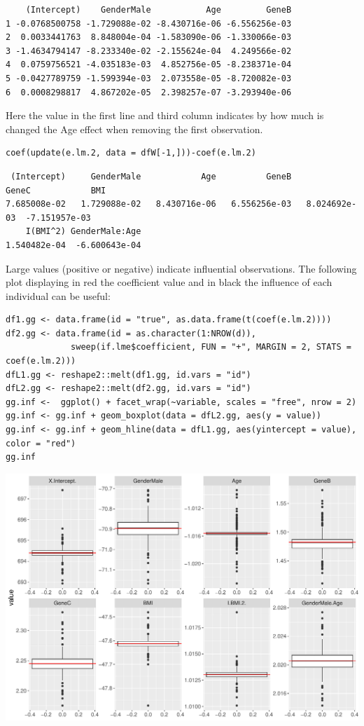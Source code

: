 \documentclass[12pt]{article}
\begin{document}
\begin{verbatim}
    (Intercept)    GenderMale           Age         GeneB
1 -0.0768500758 -1.729088e-02 -8.430716e-06 -6.556256e-03
2  0.0033441763  8.848004e-04 -1.583090e-06 -1.330066e-03
3 -1.4634794147 -8.233340e-02 -2.155624e-04  4.249566e-02
4  0.0759756521 -4.035183e-03  4.852756e-05 -8.238371e-04
5 -0.0427789759 -1.599394e-03  2.073558e-05 -8.720082e-03
6  0.0008298817  4.867202e-05  2.398257e-07 -3.293940e-06
\end{verbatim}

Here the value in the first line and third column indicates by how
much is changed the Age effect when removing the first observation.
\lstset{language=r,label= ,caption= ,captionpos=b,numbers=none}
\begin{lstlisting}
coef(update(e.lm.2, data = dfW[-1,]))-coef(e.lm.2)
\end{lstlisting}

\begin{verbatim}
 (Intercept)     GenderMale            Age          GeneB          GeneC            BMI 
7.685008e-02   1.729088e-02   8.430716e-06   6.556256e-03   8.024692e-03  -7.151957e-03 
    I(BMI^2) GenderMale:Age 
1.540482e-04  -6.600643e-04
\end{verbatim}

Large values (positive or negative) indicate influential
observations. The following plot displaying in red the coefficient
value and in black the influence of each individual can be useful:
\lstset{language=r,label= ,caption= ,captionpos=b,numbers=none}
\begin{lstlisting}
df1.gg <- data.frame(id = "true", as.data.frame(t(coef(e.lm.2))))
df2.gg <- data.frame(id = as.character(1:NROW(d)), 
		     sweep(if.lme$coefficient, FUN = "+", MARGIN = 2, STATS = coef(e.lm.2)))
dfL1.gg <- reshape2::melt(df1.gg, id.vars = "id")
dfL2.gg <- reshape2::melt(df2.gg, id.vars = "id")
gg.inf <-  ggplot() + facet_wrap(~variable, scales = "free", nrow = 2)
gg.inf <- gg.inf + geom_boxplot(data = dfL2.gg, aes(y = value))
gg.inf <- gg.inf + geom_hline(data = dfL1.gg, aes(yintercept = value), color = "red")
gg.inf
\end{lstlisting}

\begin{center}
\includegraphics[width=\textwidth]{./figures/A5-boxplot.pdf}
\end{center}
\end{document}
